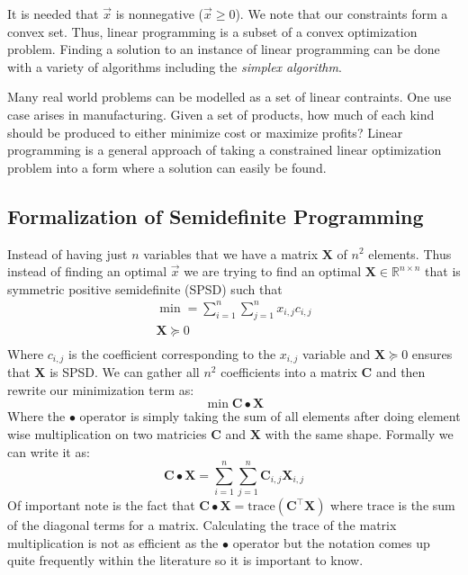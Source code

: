 \documentclass{article}
\begin{document}
It is needed that \( \vec{x} \) is nonnegative (\( \vec{x} \geq 0 \)). We note that our constraints form a convex set.
Thus, linear programming is a subset of a convex optimization problem.
Finding a solution to an instance of linear programming can be done with a variety of algorithms including the \emph{simplex algorithm}.

Many real world problems can be modelled as a set of linear contraints. One use case arises in manufacturing.
Given a set of products, how much of each kind should be produced to either minimize cost or maximize profits?
Linear programming is a general approach of taking a constrained linear optimization problem into a form where a solution can easily be found.

\subsection{Formalization of Semidefinite Programming}
Instead of having just \( n \) variables that we have a matrix \( \mathbf{X} \) of \( n^2 \) elements. Thus instead of finding an optimal \( \vec{x} \) we are trying to find an optimal \( \mathbf{X} \in \mathbb{R}^{n \times n} \) that is symmetric positive semidefinite (SPSD) such that
\begin{gather*}
\min = \sum_{i = 1}^n \sum_{j = 1}^n x_{i, j} c_{i , j} \\
\mathbf{X} \succeq 0 \\
\end{gather*}
Where \( c_{i, j} \) is the coefficient corresponding to the \( x_{i, j} \) variable and \( \mathbf{X} \succeq 0 \) ensures that \( \mathbf{X} \) is SPSD. We can gather all \( n^2 \) coefficients into a matrix \( \mathbf{C} \) and then rewrite our minimization term as:
\[
\min \mathbf{C} \bullet \mathbf{X}
\]
Where the \( \bullet \) operator is simply taking the sum of all elements after doing element wise multiplication on two matricies \( \mathbf{C} \) and \( \mathbf{X} \) with the same shape. Formally we can write it as:
\[
  \mathbf{C} \bullet \mathbf{X} = \sum_{i = 1}^n \sum_{j = 1}^n \mathbf{C}_{i, j} \mathbf{X}_{i, j}
\]
Of important note is the fact that \( \mathbf{C} \bullet \mathbf{X} = \text{trace}(\mathbf{C}^\top \mathbf{X}) \) where \( \text{trace} \) is the sum of the diagonal terms for a matrix. Calculating the \( \text{trace} \) of the matrix multiplication is not as efficient as the \( \bullet \) operator but the notation comes up quite frequently within the literature so it is important to know.
\end{document}
